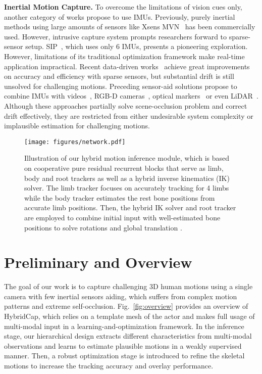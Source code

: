 \documentclass[letterpaper]{article} \usepackage{aaai23}  \usepackage{times}  \usepackage{helvet}  \usepackage{courier}  \usepackage[hyphens]{url}  \usepackage{graphicx} \urlstyle{rm} \def\UrlFont{\rm}  \usepackage{natbib}  \usepackage{caption} \frenchspacing  \setlength{\pdfpagewidth}{8.5in}  \setlength{\pdfpageheight}{11in}  \usepackage{algorithm}
\newcommand{\myparagraph}[1]{\vspace{0.1em}\noindent\textbf{#1}}
\begin{document}
\myparagraph{Inertial Motion Capture.}
To overcome the limitations of vision cues only, another category of works propose to use IMUs. 
Previously, purely inertial methods using large amounts of sensors like Xsens MVN~\cite{XSENS} has been commercially used. However, intrusive capture system prompts researchers forward to sparse-sensor setup. SIP~\cite{von2017SIP}, which uses only 6 IMUs, presents a pioneering exploration. However, limitations of its traditional optimization framework make real-time application impractical. Recent data-driven works~\cite{huang2018DIP,TransPose2021,PIPCVPR2022} achieve great improvements on accuracy and efficiency with sparse sensors, but substantial drift is still unsolved for challenging motions.
Preceding sensor-aid solutions propose to combine IMUs with videos~\cite{gilbert2019fusing,henschel2020accurate,malleson2019real,malleson2017real}, RGB-D cameras~\cite{helten2013real,Zheng2018HybridFusion}, optical markers~\cite{Andrews2016} 
or even LiDAR~\cite{10049734}. 
Although these approaches partially solve scene-occlusion problem and correct drift effectively, they are restricted from either undesirable system complexity or implausible estimation for challenging motions.

 \begin{figure*}[t]
	\centering
	\texttt{[image: figures/network.pdf]}
	\caption{Illustration of our hybrid motion inference module, which is based on cooperative pure residual recurrent blocks that serve as limb, body and root trackers as well as a hybrid inverse kinematics (IK) solver. The limb tracker focuses on accurately tracking for 4 limbs while the body tracker estimates the rest bone positions from accurate limb positions. Then, the hybrid IK solver and root tracker are employed to combine initial input with well-estimated bone positions to solve rotations  and global translation .}
	\label{fig:fig_3_network}
	\vspace{-3mm}
\end{figure*}

\section{Preliminary and Overview}
The goal of our work is to capture challenging 3D human motions using a single camera with few inertial sensors aiding, which suffers from complex motion patterns and extreme self-occlusion.
Fig.~\ref{fig:overview} provides an overview of HybridCap, which relies on a template mesh of the actor and makes full usage of multi-modal input in a learning-and-optimization framework.
In the inference stage, our hierarchical design extracts different characteristics from multi-modal observations and learns to estimate plausible motions in a weakly supervised manner. 
Then, a robust optimization stage is introduced to refine the skeletal motions to increase the tracking accuracy and overlay performance.
\end{document}
